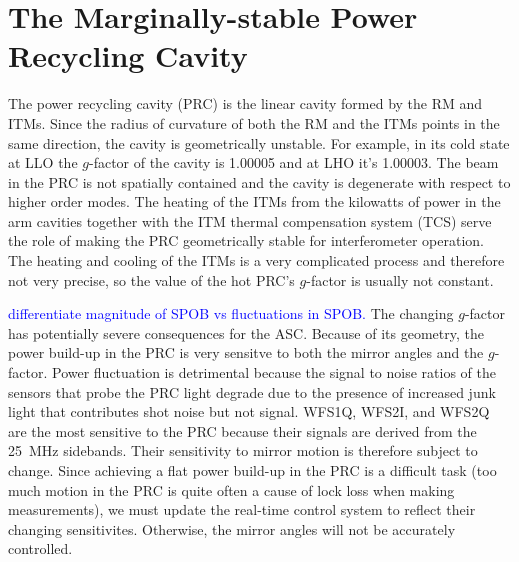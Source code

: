 \section{The Marginally-stable Power Recycling Cavity}
The power recycling cavity (PRC) is the linear cavity formed by the RM
and ITMs. Since the radius of curvature of both the RM and the ITMs
points in the same direction, the cavity is geometrically
unstable. For example, in its cold state at LLO the $g$-factor of the
cavity is 1.00005 and at LHO it's 1.00003. The beam in the PRC is not
spatially contained and the cavity is degenerate with respect to
higher order modes. The heating of the ITMs from the kilowatts of
power in the arm cavities together with the ITM thermal compensation
system (TCS) serve the role of making the PRC geometrically stable for
interferometer operation. The heating and cooling of the ITMs is a
very complicated process and therefore not very precise, so the value
of the hot PRC's $g$-factor is usually not constant.

\textcolor{blue}{differentiate magnitude of SPOB vs fluctuations in
  SPOB.} The changing $g$-factor has potentially severe consequences
for the ASC. Because of its geometry, the power build-up in the PRC is
very sensitve to both the mirror angles and the $g$-factor. Power
fluctuation is detrimental because the signal to noise ratios of the
sensors that probe the PRC light degrade due to the presence of
increased junk light that contributes shot noise but not
signal. WFS1Q, WFS2I, and WFS2Q are the most sensitive to the PRC
because their signals are derived from the 25~MHz sidebands. Their
sensitivity to mirror motion is therefore subject to change. Since
achieving a flat power build-up in the PRC is a difficult task (too
much motion in the PRC is quite often a cause of lock loss when making
measurements), we must update the real-time control system to reflect
their changing sensitivites. Otherwise, the mirror angles will not be
accurately controlled.

